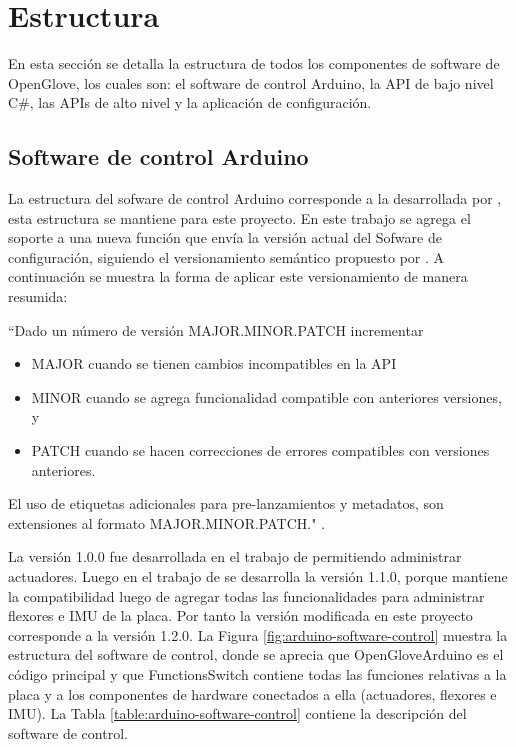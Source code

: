 \section{Estructura}
En esta sección se detalla la estructura de todos los componentes de software de OpenGlove, los cuales son: el software de control Arduino, la API de bajo nivel C\#, las APIs de alto nivel  y la aplicación de configuración.





\subsection{Software de control Arduino}
La estructura del sofware de control Arduino corresponde a la desarrollada por \cite{tesis-cerda-rodrigo}, esta estructura se mantiene para este proyecto. En este trabajo se agrega el soporte a una nueva función que envía la versión actual del Sofware de configuración, siguiendo el versionamiento semántico propuesto por \cite{semantic-versioning-tom-preston-werner-coFounder-GitHub}. A continuación se muestra la forma de aplicar este versionamiento de manera resumida:

``Dado un número de versión MAJOR.MINOR.PATCH incrementar
\begin{itemize}
\item MAJOR cuando se tienen cambios incompatibles en la API
\item MINOR cuando se agrega funcionalidad compatible con anteriores versiones, y
\item PATCH cuando se hacen correcciones de errores compatibles con versiones anteriores.
\end{itemize}
El uso de etiquetas adicionales para pre-lanzamientos y metadatos, son extensiones al formato MAJOR.MINOR.PATCH." \citep{semantic-versioning-tom-preston-werner-coFounder-GitHub}. 

La versión 1.0.0 fue desarrollada en el trabajo de \cite{tesis-monsalve-rodrigo} permitiendo administrar actuadores. Luego en el trabajo de \cite{tesis-cerda-rodrigo} se desarrolla la versión 1.1.0, porque mantiene la compatibilidad luego de agregar todas las funcionalidades para administrar flexores e IMU de la placa. Por tanto la versión modificada en este proyecto corresponde a la versión 1.2.0. La Figura \ref{fig:arduino-software-control} muestra la estructura del software de control, donde se aprecia que OpenGloveArduino es el código principal y que FunctionsSwitch contiene todas las funciones relativas a la placa y a los componentes de hardware conectados a ella (actuadores, flexores e IMU). La Tabla \ref{table:arduino-software-control} contiene la descripción del software de control.

